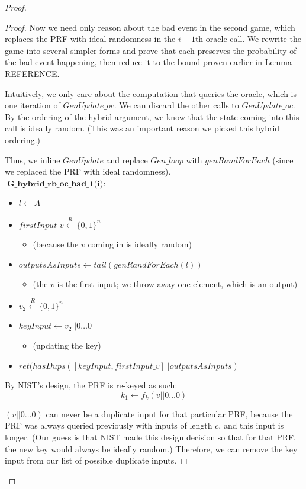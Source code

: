 \documentclass[12pt,lot, lof]{puthesis}
\newenvironment{game}
{ \begin{itemize}[noitemsep,nolistsep] 
}
{ \end{itemize}                  }
\newcommand{\samp}{\xleftarrow{R} \{0,1\}}
\newcommand{\lar}{\leftarrow}
\begin{document}
\begin{proof}
\begin{proof}
Now we need only reason about the bad event in the second game, which replaces the PRF with ideal randomness in the $i+1$th oracle call. We rewrite the game into several simpler forms and prove that each preserves the probability of the bad event happening, then reduce it to the bound proven earlier in Lemma REFERENCE.

Intuitively, we only care about the computation that queries the oracle, which is one iteration of $GenUpdate\_oc$. We can discard the other calls to $GenUpdate\_oc$. By the ordering of the hybrid argument, we know that the state coming into this call is ideally random. (This was an important reason we picked this hybrid ordering.) 

Thus, we inline $GenUpdate$ and replace $Gen\_loop$ with $genRandForEach$ (since we replaced the PRF with ideal randomness). \\

$\textbf{G\_hybrid\_rb\_oc\_bad\_1(i)} := $
\begin{game}
\item[] $l \lar A$
\item[] $firstInput\_v \samp^n$ 
  \begin{game}
    \item[] (because the $v$ coming in is ideally random)
  \end{game}
\item[] $outputsAsInputs \lar tail(genRandForEach(l))$
  \begin{game}
    \item[] (the $v$ is the first input; we throw away one element, which is an output)
  \end{game}
\item[] $v_2 \samp^n$
\item[] $keyInput \lar v_2 || 0 \ldots 0$
  \begin{game}
    \item[] (updating the key)
  \end{game}
\item[] $ret(hasDups([keyInput, firstInput\_v] || outputsAsInputs)$ \\
\end{game}

By NIST's design, the PRF is re-keyed as such:
$$k_1 \lar f_k(v || 0 \ldots 0)$$

$(v||0 \ldots 0)$ can never be a duplicate input for that particular PRF, because the PRF was always queried previously with inputs of length $c$, and this input is longer. (Our guess is that NIST made this design decision so that for that PRF, the new key would always be ideally random.) Therefore, we can remove the key input from our list of possible duplicate inputs. 


\end{proof}
\end{proof}
\end{document}
